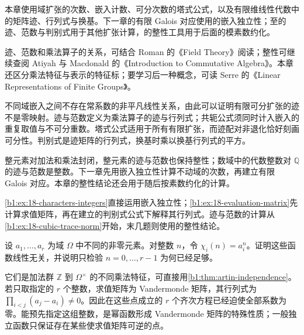\ProseParagraphBreak

本章使用域扩张的次数、嵌入计数、可分次数的塔式公式，以及有限维线性代数中的矩阵迹、行列式与换基。下一章的有限 Galois 对应使用的嵌入独立性；至的迹、范数与判别式用于其他扩张计算，的整性工具用于后面的模素数约化。

\ProseParagraphBreak
迹、范数和乘法算子的关系，可结合 Roman 的《Field Theory》\cite[Section 8.1]{Roman2006FieldTheory}阅读；整性可继续查阅 Atiyah 与 Macdonald 的《Introduction to Commutative Algebra》\cite[Chapter 5]{AtiyahMacdonald1969CommutativeAlgebra}。本章还区分乘法特征与表示的特征标；要学习后一种概念，可读 Serre 的《Linear Representations of Finite Groups》\cite[Part I, Chapters 1--2, pp. 3--24]{Serre1977FiniteRepresentations}。






\begin{chaptersummary}
	不同域嵌入之间不存在常系数的非平凡线性关系，由此可以证明有限可分扩张的迹不是零映射。迹与范数定义为乘法算子的迹与行列式；共轭公式须同时计入嵌入的重复取值与不可分重数。塔式公式适用于所有有限扩张，而迹配对非退化恰好刻画可分性。判别式是迹矩阵的行列式，换基时乘以换基行列式的平方。

	整元素对加法和乘法封闭，整元素的迹与范数也保持整性；数域中的代数整数对 \(\mathbb Q\) 的迹与范数是整数。下一章先用嵌入独立性计算不动域的次数，再建立有限 Galois 对应。本章的整性结论还会用于随后按素数约化的计算。
\end{chaptersummary}

\BookExercises

\cref{b1:ex:18-characters-integers}直接运用嵌入独立性；\cref{b1:ex:18-evaluation-matrix}先计算求值矩阵，再在建立的判别式公式下解释其行列式。迹与范数的计算从\cref{b1:ex:18-cubic-trace-norm}开始，末几题则使用的整性结论。

\begin{exercise}\label{b1:ex:18-characters-integers}
	设 \(a_1,\ldots,a_r\) 为域 \(\Omega\) 中不同的非零元素。对整数 \(n\)，令 \(\chi_i(n)=a_i^n\)。证明这些函数线性无关，并说明只检验 \(n=0,\ldots,r-1\) 为何已经足够。
\end{exercise}
\begin{solution}
	它们是加法群 \(\mathbb Z\) 到 \(\Omega^\times\) 的不同乘法特征，可直接用\cref{b1:thm:artin-independence}。若只取指定的 \(r\) 个整数，求值矩阵为 Vandermonde 矩阵，其行列式为 \(\prod_{i<j}(a_j-a_i)\ne0\)。因此在这些点成立的 \(r\) 个齐次方程已经迫使全部系数为零。能预先指定这组整数，是幂函数形成 Vandermonde 矩阵的特殊性质；一般独立函数只保证存在某些使求值矩阵可逆的点。
\end{solution}

